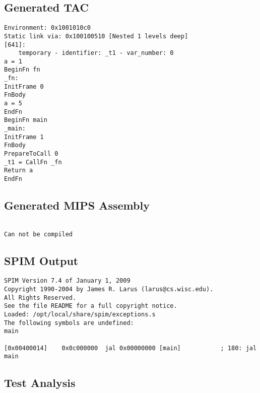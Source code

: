\subsection{Generated TAC}
\begin{verbatim}
Environment: 0x1001010c0
Static link via: 0x100100510 [Nested 1 levels deep]
[641]:
	temporary - identifier: _t1 - var_number: 0
a = 1
BeginFn fn
_fn:
InitFrame 0
FnBody
a = 5
EndFn
BeginFn main
_main:
InitFrame 1
FnBody
PrepareToCall 0
_t1 = CallFn _fn
Return a
EndFn
\end{verbatim}\subsection{Generated MIPS Assembly}
\begin{lstlisting}[showstringspaces=false,breaklines=true,backgroundcolor=\color{light-gray}, captionpos=b]
         
Can not be compiled
\end{lstlisting}\subsection{SPIM Output}
\begin{verbatim}
SPIM Version 7.4 of January 1, 2009
Copyright 1990-2004 by James R. Larus (larus@cs.wisc.edu).
All Rights Reserved.
See the file README for a full copyright notice.
Loaded: /opt/local/share/spim/exceptions.s
The following symbols are undefined:
main

[0x00400014]	0x0c000000  jal 0x00000000 [main]           ; 180: jal main
\end{verbatim}\subsection{Test Analysis}

